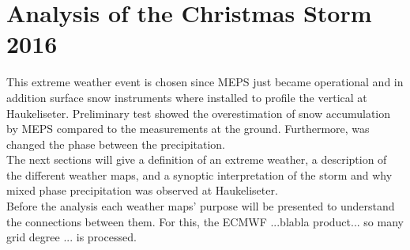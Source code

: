 \chapter{Analysis of the Christmas Storm 2016}
This extreme weather event is chosen since MEPS just became operational and in addition surface snow instruments where installed to profile the vertical at Haukeliseter. Preliminary test showed the overestimation of snow accumulation by MEPS compared to the measurements at the ground. Furthermore, was changed the phase between the precipitation.  
\\
The next sections will give a definition of an extreme weather, a description of the different weather maps, and a synoptic interpretation of the storm and why mixed phase precipitation was observed at Haukeliseter. \\
Before the analysis each weather maps' purpose  will be presented to understand the connections between them. For this, the ECMWF ...blabla product... so many grid degree ...  is processed.
\\



\newpage









